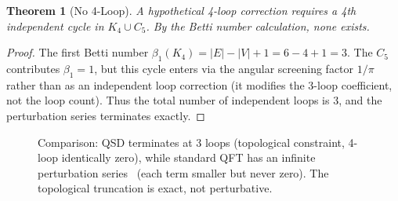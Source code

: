 \documentclass[11pt,a4paper]{article}
\newtheorem{theorem}{Theorem}[section]
\theoremstyle{definition}
\begin{document}
\begin{theorem}[No 4-Loop]
A hypothetical 4-loop correction requires a 4th independent cycle in $K_4 \cup C_5$. By the Betti number calculation, none exists.
\end{theorem}

\begin{proof}
The first Betti number $\beta_1(K_4) = |E| - |V| + 1 = 6 - 4 + 1 = 3$. The $C_5$ contributes $\beta_1 = 1$, but this cycle enters via the angular screening factor $1/\pi$ rather than as an independent loop correction (it modifies the 3-loop coefficient, not the loop count). Thus the total number of independent loops is 3, and the perturbation series terminates exactly.
\end{proof}

\begin{figure}[h]
\centering
{}
\caption{Comparison: QSD terminates at 3 loops (topological constraint, 4-loop identically zero), while standard QFT has an infinite perturbation series~\cite{Wilson1974, Kinoshita2006} (each term smaller but never zero). The topological truncation is exact, not perturbative.}
\label{fig:qsd_vs_qft}
\end{figure}
\end{document}
